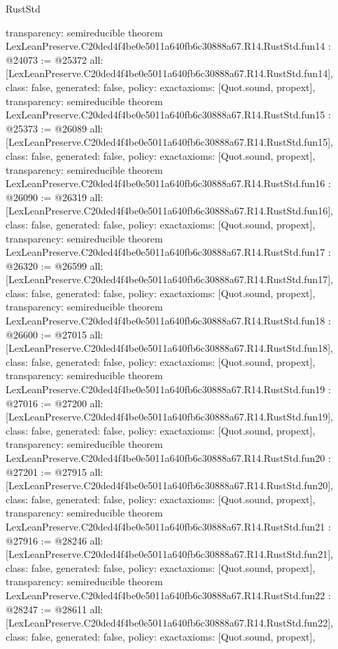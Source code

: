 \begin{lexlean}{RustStd}
\begin{coremodule}
{  transparency: semireducible
}
theorem LexLeanPreserve.C20ded4f4be0e5011a640fb6c30888a67.R14.RustStd.fun14 : @24073 := @25372 {
  all: [LexLeanPreserve.C20ded4f4be0e5011a640fb6c30888a67.R14.RustStd.fun14],
  class: false,
  generated: false,
  policy: exact{axioms: [Quot.sound, propext]},
  transparency: semireducible
}
theorem LexLeanPreserve.C20ded4f4be0e5011a640fb6c30888a67.R14.RustStd.fun15 : @25373 := @26089 {
  all: [LexLeanPreserve.C20ded4f4be0e5011a640fb6c30888a67.R14.RustStd.fun15],
  class: false,
  generated: false,
  policy: exact{axioms: [Quot.sound, propext]},
  transparency: semireducible
}
theorem LexLeanPreserve.C20ded4f4be0e5011a640fb6c30888a67.R14.RustStd.fun16 : @26090 := @26319 {
  all: [LexLeanPreserve.C20ded4f4be0e5011a640fb6c30888a67.R14.RustStd.fun16],
  class: false,
  generated: false,
  policy: exact{axioms: [Quot.sound, propext]},
  transparency: semireducible
}
theorem LexLeanPreserve.C20ded4f4be0e5011a640fb6c30888a67.R14.RustStd.fun17 : @26320 := @26599 {
  all: [LexLeanPreserve.C20ded4f4be0e5011a640fb6c30888a67.R14.RustStd.fun17],
  class: false,
  generated: false,
  policy: exact{axioms: [Quot.sound, propext]},
  transparency: semireducible
}
theorem LexLeanPreserve.C20ded4f4be0e5011a640fb6c30888a67.R14.RustStd.fun18 : @26600 := @27015 {
  all: [LexLeanPreserve.C20ded4f4be0e5011a640fb6c30888a67.R14.RustStd.fun18],
  class: false,
  generated: false,
  policy: exact{axioms: [Quot.sound, propext]},
  transparency: semireducible
}
theorem LexLeanPreserve.C20ded4f4be0e5011a640fb6c30888a67.R14.RustStd.fun19 : @27016 := @27200 {
  all: [LexLeanPreserve.C20ded4f4be0e5011a640fb6c30888a67.R14.RustStd.fun19],
  class: false,
  generated: false,
  policy: exact{axioms: [Quot.sound, propext]},
  transparency: semireducible
}
theorem LexLeanPreserve.C20ded4f4be0e5011a640fb6c30888a67.R14.RustStd.fun20 : @27201 := @27915 {
  all: [LexLeanPreserve.C20ded4f4be0e5011a640fb6c30888a67.R14.RustStd.fun20],
  class: false,
  generated: false,
  policy: exact{axioms: [Quot.sound, propext]},
  transparency: semireducible
}
theorem LexLeanPreserve.C20ded4f4be0e5011a640fb6c30888a67.R14.RustStd.fun21 : @27916 := @28246 {
  all: [LexLeanPreserve.C20ded4f4be0e5011a640fb6c30888a67.R14.RustStd.fun21],
  class: false,
  generated: false,
  policy: exact{axioms: [Quot.sound, propext]},
  transparency: semireducible
}
theorem LexLeanPreserve.C20ded4f4be0e5011a640fb6c30888a67.R14.RustStd.fun22 : @28247 := @28611 {
  all: [LexLeanPreserve.C20ded4f4be0e5011a640fb6c30888a67.R14.RustStd.fun22],
  class: false,
  generated: false,
  policy: exact{axioms: [Quot.sound, propext]},
}
\end{coremodule}
\end{lexlean}
